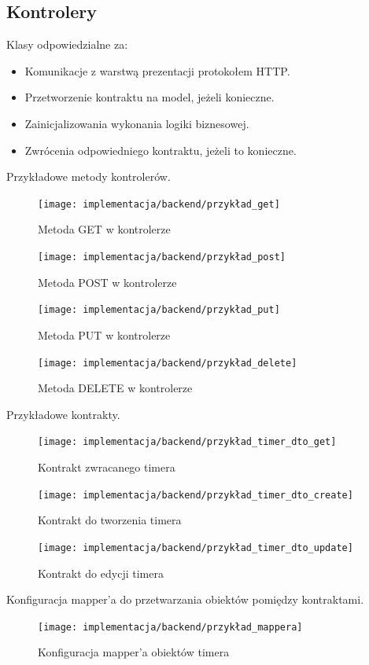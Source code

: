 \documentclass[a4paper,11pt]{report}
\begin{document}
\subsection{Kontrolery}
Klasy odpowiedzialne za:
\begin{itemize}
	\item Komunikacje z warstwą prezentacji protokołem HTTP.
	\item Przetworzenie kontraktu na model, jeżeli konieczne.
	\item Zainicjalizowania wykonania logiki biznesowej.
	\item Zwrócenia odpowiedniego kontraktu, jeżeli to konieczne.
\end{itemize}
Przykładowe metody kontrolerów.
\begin{figure}[H]
	\centering
	\texttt{[image: implementacja/backend/przykład\_get]}\\
	\caption{Metoda GET w kontrolerze}
	\label{fig:przykład_get}
\end{figure}
\begin{figure}[H]
	\centering
	\texttt{[image: implementacja/backend/przykład\_post]}\\
	\caption{Metoda POST w kontrolerze}
	\label{fig:przykład_post}
\end{figure}
\begin{figure}[H]
	\centering
	\texttt{[image: implementacja/backend/przykład\_put]}\\
	\caption{Metoda PUT w kontrolerze}
	\label{fig:przykład_put}
\end{figure}
\begin{figure}[H]
	\centering
	\texttt{[image: implementacja/backend/przykład\_delete]}\\
	\caption{Metoda DELETE w kontrolerze}
	\label{fig:przykład_delete}
\end{figure}
Przykładowe kontrakty.
\begin{figure}[H]
	\centering
	\texttt{[image: implementacja/backend/przykład\_timer\_dto\_get]}\\
	\caption{Kontrakt zwracanego timera}
	\label{fig:przykład_timer_dto_get}
\end{figure}
\begin{figure}[H]
	\centering
	\texttt{[image: implementacja/backend/przykład\_timer\_dto\_create]}\\
	\caption{Kontrakt do tworzenia timera}
	\label{fig:przykład_timer_dto_create}
\end{figure}
\begin{figure}[H]
	\centering
	\texttt{[image: implementacja/backend/przykład\_timer\_dto\_update]}\\
	\caption{Kontrakt do edycji timera}
	\label{fig:przykład_timer_dto_update}
\end{figure}
Konfiguracja mapper'a do przetwarzania obiektów pomiędzy kontraktami.
\begin{figure}[H]
	\centering
	\texttt{[image: implementacja/backend/przykład\_mappera]}\\
	\caption{Konfiguracja mapper'a obiektów timera}
	\label{fig:przykład_mappera}
\end{figure}
\end{document}
